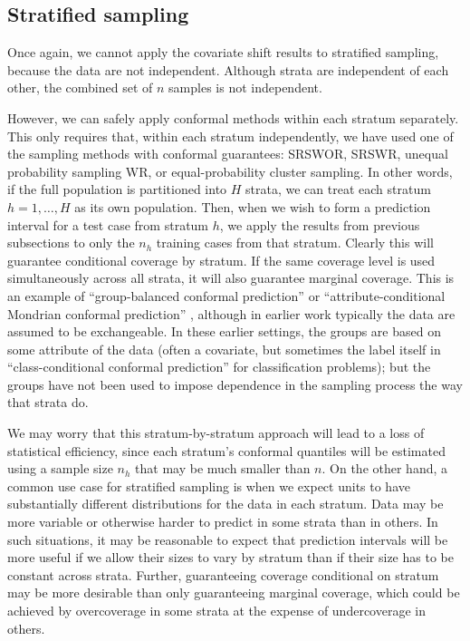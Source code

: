 \documentclass[10.5pt, letterpaper]{article}
\numberwithin{table}{section}
\numberwithin{figure}{section}
\numberwithin{equation}{section}
\begin{document}
\subsection{Stratified sampling}\label{sec:Strata}

Once again, we cannot apply the covariate shift results to stratified sampling, because the data are not independent. Although strata are independent of each other, the combined set of $n$ samples is not independent.

However, we can safely apply conformal methods within each stratum separately. This only requires that, within each stratum independently, we have used one of the sampling methods with conformal guarantees: SRSWOR, SRSWR, unequal probability sampling WR, or equal-probability cluster sampling. In other words, if the full population is partitioned into $H$ strata, we can treat each stratum $h=1,\ldots,H$ as its own population. Then, when we wish to form a prediction interval for a test case from stratum $h$, we apply the results from previous subsections to only the $n_h$ training cases from that stratum. Clearly this will guarantee conditional coverage by stratum. If the same coverage level is used simultaneously across all strata, it will also guarantee marginal coverage. This is an example of ``group-balanced conformal prediction'' or ``attribute-conditional Mondrian conformal prediction'' \citep{vovk2005algorithmic, vovk2013conditional, angelopoulos2022gentle}, although in earlier work typically the data are assumed to be exchangeable. In these earlier settings, the groups are based on some attribute of the data (often a covariate, but sometimes the label itself in ``class-conditional conformal prediction'' for classification problems); but the groups have not been used to impose dependence in the sampling process the way that strata do.

We may worry that this stratum-by-stratum approach will lead to a loss of statistical efficiency, since each stratum's conformal quantiles will be estimated using a sample size $n_h$ that may be much smaller than $n$. On the other hand, a common use case for stratified sampling is when we expect units to have substantially different distributions for the data in each stratum. Data may be more variable or otherwise harder to predict in some strata than in others. In such situations, it may be reasonable to expect that prediction intervals will be more useful if we allow their sizes to vary by stratum than if their size has to be constant across strata. Further, guaranteeing coverage conditional on stratum may be more desirable than only guaranteeing marginal coverage, which could be achieved by overcoverage in some strata at the expense of undercoverage in others.
\end{document}

